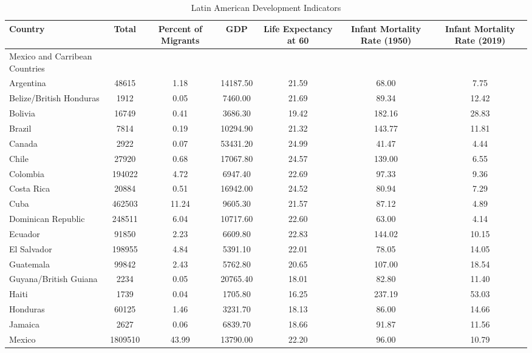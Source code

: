 \documentclass[
]{article}
\begin{document}
\begin{landscape} 


\begin{table}[ht]
\centering
\caption{Latin American Development Indicators} 
\begin{tabular}{l|cccccc}
  \hline
Country & Total & Percent of Migrants & GDP & Life Expectancy at 60 & Infant Mortality Rate (1950) & Infant Mortality Rate (2019) \\ 
  \hline
Mexico and Carribean Countries &  &  &  &  &  &  \\ 
  Argentina & 48615 & 1.18 & 14187.50 & 21.59 & 68.00 & 7.75 \\ 
  Belize/British Honduras & 1912 & 0.05 & 7460.00 & 21.69 & 89.34 & 12.42 \\ 
  Bolivia & 16749 & 0.41 & 3686.30 & 19.42 & 182.16 & 28.83 \\ 
  Brazil & 7814 & 0.19 & 10294.90 & 21.32 & 143.77 & 11.81 \\ 
  Canada & 2922 & 0.07 & 53431.20 & 24.99 & 41.47 & 4.44 \\ 
  Chile & 27920 & 0.68 & 17067.80 & 24.57 & 139.00 & 6.55 \\ 
  Colombia & 194022 & 4.72 & 6947.40 & 22.69 & 97.33 & 9.36 \\ 
  Costa Rica & 20884 & 0.51 & 16942.00 & 24.52 & 80.94 & 7.29 \\ 
  Cuba & 462503 & 11.24 & 9605.30 & 21.57 & 87.12 & 4.89 \\ 
  Dominican Republic & 248511 & 6.04 & 10717.60 & 22.60 & 63.00 & 4.14 \\ 
  Ecuador & 91850 & 2.23 & 6609.80 & 22.83 & 144.02 & 10.15 \\ 
  El Salvador & 198955 & 4.84 & 5391.10 & 22.01 & 78.05 & 14.05 \\ 
  Guatemala & 99842 & 2.43 & 5762.80 & 20.65 & 107.00 & 18.54 \\ 
  Guyana/British Guiana & 2234 & 0.05 & 20765.40 & 18.01 & 82.80 & 11.40 \\ 
  Haiti & 1739 & 0.04 & 1705.80 & 16.25 & 237.19 & 53.03 \\ 
  Honduras & 60125 & 1.46 & 3231.70 & 18.13 & 86.00 & 14.66 \\ 
  Jamaica & 2627 & 0.06 & 6839.70 & 18.66 & 91.87 & 11.56 \\ 
  Mexico & 1809510 & 43.99 & 13790.00 & 22.20 & 96.00 & 10.79 \\ 

\end{tabular}
\end{table}
\end{landscape}
\end{document}
